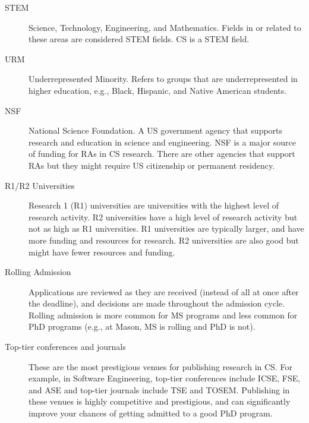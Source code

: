 \documentclass[oneside,11pt,dvipsnames]{book}
\begin{document}
\begin{description}
  \item[STEM] Science, Technology, Engineering, and Mathematics. Fields in or related to these areas are considered STEM fields. CS is a STEM field.
    
  \item[URM] Underrepresented Minority. Refers to groups that are underrepresented in higher education, e.g., Black, Hispanic, and Native American students.
  \item[NSF] National Science Foundation. A US government agency that supports research and education in science and engineering. NSF is a major source of funding for RAs in CS research. There are other agencies that support RAs but they might require US citizenship or permanent residency.
    
  \item [R1/R2 Universities] Research 1 (R1) universities are universities with the highest level of research activity. R2 universities have a high level of research activity but not as high as R1 universities.  R1 universities are typically larger, and have more funding and resources for research.  R2 universities are also good but might have fewer resources and funding.
  
    \item [Rolling Admission] Applications are reviewed as they are received (instead of all at once after the deadline), and decisions are made throughout the admission cycle.  Rolling admission is more common for MS programs and less common for PhD programs (e.g., at Mason, MS is rolling and PhD is not).

  \item [Top-tier conferences and journals] These are the most prestigious venues for publishing research in CS.  For example, in Software Engineering, top-tier conferences include ICSE, FSE, and ASE and top-tier journals include TSE and TOSEM.  Publishing in these venues is highly competitive and prestigious, and can significantly improve your chances of getting admitted to a good PhD program.


\end{description}
\end{document}
